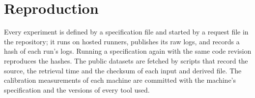 \section{Reproduction}
\label{sec:repro}

Every experiment is defined by a specification file and started by a request file in the repository; it runs on
hosted runners, publishes its raw logs, and records a hash of each run's logs. Running a specification again with the
same code revision reproduces the hashes. The public datasets are fetched by scripts that record the source, the
retrieval time and the checksum of each input and derived file. The calibration measurements of each machine are
committed with the machine's specification and the versions of every tool used.
